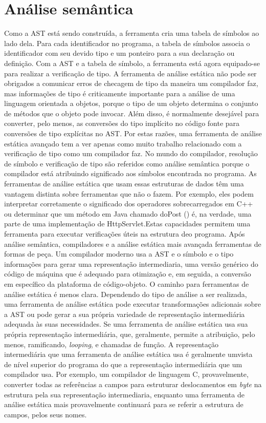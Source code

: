 	\section{Análise semântica}
	Como a AST está sendo construída, a ferramenta cria uma tabela de símbolos ao lado dela. Para cada identificador no programa, a tabela de símbolos associa o identificador com seu devido tipo e um ponteiro para a sua declaração ou definição. Com a AST e a tabela de símbolo, a ferramenta está agora equipado-se para realizar a verificação de tipo. A ferramenta de análise estática não pode ser obrigados a comunicar erros de checagem de tipo da maneira um compilador faz, mas informações de tipo é criticamente importante para a análise de uma linguagem orientada a objetos, porque o tipo de um objeto determina o conjunto de métodos que o objeto pode invocar. Além disso, é normalmente desejável para converter, pelo menos, as conversões do tipo implícito no código fonte para conversões de tipo explícitas no AST. Por estas razões, uma ferramenta de análise estática avançado tem a ver apenas como muito trabalho relacionado com a verificação de tipo como um compilador faz. No mundo do compilador, resolução de símbolo e verificação de tipo são referidos como análise semântica porque o compilador está atribuindo significado aos símbolos encontrada no programa. As ferramentas de análise estática que usam essas estruturas de dados têm uma vantagem distinta sobre ferramentas que não o fazem. Por exemplo, eles podem interpretar corretamente o significado dos operadores sobrecarregados em C++ ou determinar que um método em Java chamado doPost () é, na verdade, uma parte de uma implementação de HttpServlet.Estas capacidades permitem uma ferramenta para executar verificações úteis na estrutura deo programa. Após análise semântica, compiladores e a análise estática mais avançada ferramentas de formas de peça. Um compilador moderno usa a AST e o símbolo e o tipo informações para gerar uma representação intermediaria, uma versão genérico do código de máquina que é adequado para otimização e, em seguida, a conversão em específico da plataforma de código-objeto. O caminho para ferramentas de análise estática é menos clara. Dependendo do tipo de análise a ser realizada, uma ferramenta de análise estática pode executar transformações adicionais sobre a AST ou pode gerar a sua própria variedade de representação intermediária adequada às suas necessidades. Se uma ferramenta de análise estática usa sua própria representação intermediária, que, geralmente, permite a atribuição, pelo menos, ramificando, {\it looping}, e chamadas de função. A representação intermediária que uma ferramenta de análise estática usa é geralmente umvista de nível superior do programa do que a representação intermediária que um compilador usa. Por exemplo, um compilador de linguagem C, provavelmente, converter todas as referências a campos para estruturar deslocamentos em {\it byte} na estrutura pela sua representação intermediaria, enquanto uma ferramenta de análise estática mais provavelmente continuará para se referir a estrutura de campos, pelos seus nomes.